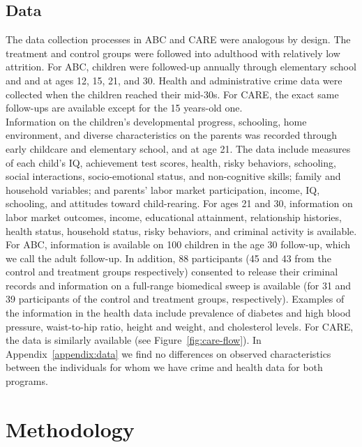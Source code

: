 \subsection{Data}

\noindent The data collection processes in ABC and CARE were analogous by design. The treatment and control groups were followed into adulthood with relatively low attrition. For ABC, children were followed-up annually through elementary school and and at ages 12, 15, 21, and 30. Health and administrative crime data were collected when the children reached their mid-30s. For CARE, the exact same follow-ups are available except for the 15 years-old one.\\

\noindent Information on the children’s developmental progress, schooling, home environment, and diverse characteristics on the parents was recorded through early childcare and elementary school, and at age 21. The data include measures of each child’s IQ, achievement test scores, health, risky behaviors, schooling, social interactions, socio-emotional status, and non-cognitive skills; family and household variables; and parents’ labor market participation, income, IQ, schooling, and attitudes toward child-rearing. For ages 21 and 30, information on labor market outcomes, income, educational attainment, relationship histories, health status, household status, risky behaviors, and criminal activity is available.\\

\noindent For ABC, information is available on 100 children in the age 30 follow-up, which we call the adult follow-up. In addition, 88 participants (45 and 43 from the control and treatment groups respectively) consented to release their criminal records and information on a full-range biomedical sweep is available (for 31 and 39 participants of the control and treatment groups, respectively). Examples of the information in the health data include prevalence of diabetes and high blood pressure, waist-to-hip ratio, height and weight, and cholesterol levels. For CARE, the data is similarly available (see Figure~\ref{fig:care-flow}). In Appendix~\ref{appendix:data} we find no differences on observed characteristics between the individuals for whom we have crime and health data for both programs.

\section{Methodology} \label{section:methodology}

\clearpage
\singlespace



 